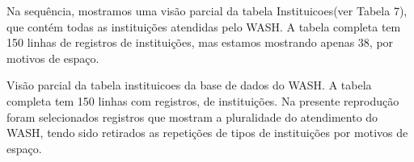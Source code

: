 \documentclass[
12pt,		%
openright,	%
twoside,  %
a4paper,			%
chapter=TITLE,		%
english,			%
french,				%
spanish,			%
brazil				%
]{USPSC-classe/USPSC}
\begin{document}
Na sequ\^encia, mostramos uma vis\~ao parcial da tabela \textquotedbl Instituicoes\textquotedbl  (ver Tabela 7), que cont\'em todas as institui\c{c}\~oes atendidas pelo WASH. A tabela completa tem 150 linhas de registros de institui\c{c}\~oes, mas estamos mostrando apenas 38, por motivos de espa\c{c}o.





















\begin{table}[htb]
\tiny
\caption{\label{89e4a4c81cad3904f1348ca629486a33cc2c9bb6}Vis\~ao parcial da tabela instituicoes da base de dados do WASH. A tabela completa tem 150 linhas com registros, de institui\c{c}\~oes. Na presente reprodu\c{c}\~ao foram selecionados registros que mostram a pluralidade do atendimento do WASH, tendo sido retirados as repeti\c{c}\~oes de tipos de institui\c{c}\~oes por motivos de espa\c{c}o.}


\end{table}
\end{document}
